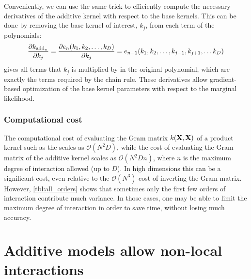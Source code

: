 Conveniently, we can use the same trick to efficiently compute the necessary derivatives of the additive kernel with respect to the base kernels.
This can be done by removing the base kernel of interest, $k_j$, from each term of the polynomials:
%
\begin{align}
\frac{\partial k_{\textnormal{add}_n}}{\partial k_j} = 
\frac{\partial e_{n}(k_1,k_2,\dots, k_D)}{\partial k_j} = 
e_{n-1}(k_1, k_2, \dots,k_{j-1},k_{j+1}, \dots k_D)
\label{eq:additive-derivatives}
\end{align}
%
 gives all terms that $k_j$ is multiplied by in the original polynomial, which are exactly the terms required by the chain rule.
These derivatives allow gradient-based optimization of the base kernel parameters with respect to the marginal likelihood.




\subsubsection{Computational cost}
The computational cost of evaluating the Gram matrix $k(\mathbf{X}, \mathbf{X})$ of a product kernel such as the \seard{} scales as $\mathcal{O}(N^2D)$, while the cost of evaluating the Gram matrix of the additive kernel scales as $\mathcal{O}(N^2Dn)$, where $n$ is the maximum degree of interaction allowed (up to $D$).
In high dimensions this can be a significant cost, even relative to the $\mathcal{O}(N^3)$ cost of inverting the Gram matrix.
However, \cref{tbl:all_orders} shows that sometimes only the first few orders of interaction contribute much variance.
In those cases, one may be able to limit the maximum degree of interaction in order to save time, without losing much accuracy.



\section{Additive models allow non-local interactions}

